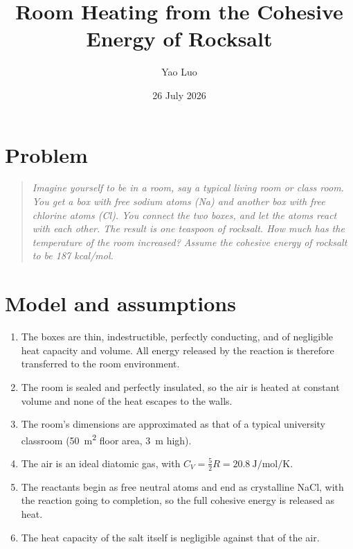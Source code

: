 \documentclass[11pt]{article}
\title{Room Heating from the Cohesive Energy of Rocksalt}
\author{Yao Luo}
\date{26 July 2026}
\begin{document}
\maketitle

\section{Problem}

\begin{quote}
\itshape
Imagine yourself to be in a room, say a typical living room or class room. You
get a box with free sodium atoms (Na) and another box with free chlorine atoms
(Cl). You connect the two boxes, and let the atoms react with each other. The
result is one teaspoon of rocksalt. How much has the temperature of the room
increased? Assume the cohesive energy of rocksalt to be 187 kcal/mol.
\end{quote}

\section{Model and assumptions}

\begin{enumerate}
  \item The boxes are thin, indestructible, perfectly conducting, and of
        negligible heat capacity and volume. All energy released by the reaction is therefore transferred to the room environment.
  \item The room is sealed and perfectly insulated, so the air is heated at
        constant volume and none of the heat escapes to the walls.
  \item The room's dimensions are approximated as that of a typical university
        classroom (\qty{50}{\meter\squared} floor area, \qty{3}{\meter} high).
  \item The air is an ideal diatomic gas, with $C_V = \tfrac{5}{2}R
    = \qty{20.8}{\joule\per\mole\per\kelvin}$.
  \item The reactants begin as free neutral atoms and end as crystalline NaCl, with the reaction going to completion, so the full cohesive energy is released as heat.
  \item The heat capacity of the salt itself is negligible against that of the air.
\end{enumerate}
\end{document}
